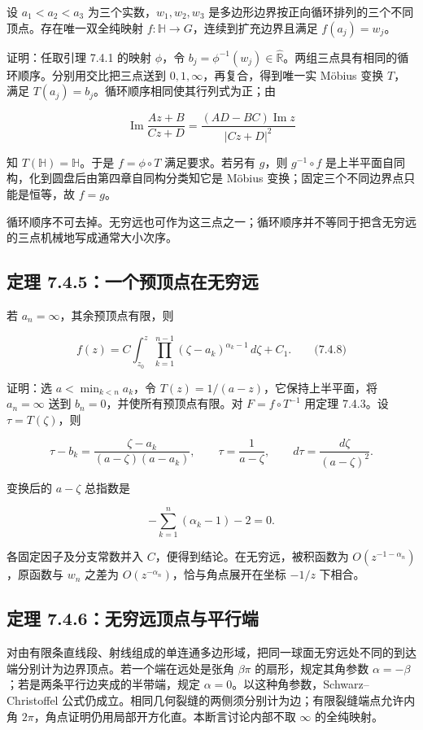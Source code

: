 \documentclass[11pt,a4paper]{article}
\begin{document}
设 \(a_1<a_2<a_3\) 为三个实数，\(w_1,w_2,w_3\)
是多边形边界按正向循环排列的三个不同顶点。存在唯一双全纯映射
\(f:\mathbb H\to G\)，连续到扩充边界且满足 \(f(a_j)=w_j\)。

证明：任取引理 7.4.1 的映射 \(\phi\)，令
\(b_j=\phi^{-1}(w_j)\in\widehat{\mathbb R}\)。两组三点具有相同的循环顺序。分别用交比把三点送到
\(0,1,\infty\)，再复合，得到唯一实 Möbius 变换 \(T\)，满足
\(T(a_j)=b_j\)。循环顺序相同使其行列式为正；由

\[
\operatorname{Im}\frac{Az+B}{Cz+D}
=\frac{(AD-BC)\operatorname{Im}z}{|Cz+D|^2}
\]

知 \(T(\mathbb H)=\mathbb H\)。于是 \(f=\phi\circ T\) 满足要求。若另有
\(g\)，则 \(g^{-1}\circ f\)
是上半平面自同构，化到圆盘后由第四章自同构分类知它是 Möbius
变换；固定三个不同边界点只能是恒等，故 \(f=g\)。

循环顺序不可去掉。无穷远也可作为这三点之一；循环顺序并不等同于把含无穷远的三点机械地写成通常大小次序。

\subsection{定理 7.4.5：一个预顶点在无穷远}\label{ch07-s4-heading-6}

若 \(a_n=\infty\)，其余预顶点有限，则

\[
f(z)=C\int_{z_0}^z\prod_{k=1}^{n-1}(\zeta-a_k)^{\alpha_k-1}\,d\zeta+C_1.
\qquad\text{(7.4.8)}
\]

证明：选 \(a<\min_{k<n}a_k\)，令 \(T(z)=1/(a-z)\)，它保持上半平面，将
\(a_n=\infty\) 送到 \(b_n=0\)，并使所有预顶点有限。对
\(F=f\circ T^{-1}\) 用定理 7.4.3。设 \(\tau=T(\zeta)\)，则

\[
\tau-b_k=\frac{\zeta-a_k}{(a-\zeta)(a-a_k)},\qquad
\tau=\frac1{a-\zeta},\qquad d\tau=\frac{d\zeta}{(a-\zeta)^2}.
\]

变换后的 \(a-\zeta\) 总指数是

\[
-\sum_{k=1}^{n}(\alpha_k-1)-2=0.
\]

各固定因子及分支常数并入 \(C\)，便得到结论。在无穷远，被积函数为
\(O(z^{-1-\alpha_n})\)，原函数与 \(w_n\) 之差为
\(O(z^{-\alpha_n})\)，恰与角点展开在坐标 \(-1/z\) 下相合。

\subsection{定理 7.4.6：无穷远顶点与平行端}\label{ch07-s4-heading-7}

对由有限条直线段、射线组成的单连通多边形域，把同一球面无穷远处不同的到达端分别计为边界顶点。若一个端在远处是张角
\(\beta\pi\) 的扇形，规定其角参数
\(\alpha=-\beta\)；若是两条平行边夹成的半带端，规定
\(\alpha=0\)。以这种角参数，Schwarz--Christoffel
公式仍成立。相同几何裂缝的两侧须分别计为边；有限裂缝端点允许内角
\(2\pi\)，角点证明仍用局部开方化直。本断言讨论内部不取 \(\infty\)
的全纯映射。
\end{document}
